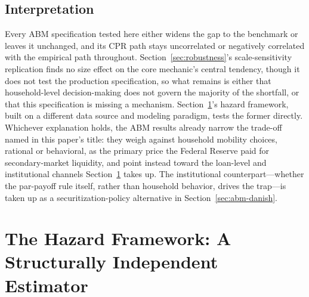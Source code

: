 \documentclass[12pt]{article}
\begin{document}
\subsection{Interpretation}\label{sec:abm-interp}

Every ABM specification tested here either widens the gap to the benchmark or leaves it unchanged, and its CPR path stays uncorrelated or negatively correlated with the empirical path throughout. Section~\ref{sec:robustness}'s scale-sensitivity replication finds no size effect on the core mechanic's central tendency, though it does not test the production specification, so what remains is either that household-level decision-making does not govern the majority of the shortfall, or that this specification is missing a mechanism. Section~\ref{sec:hazard}'s hazard framework, built on a different data source and modeling paradigm, tests the former directly. Whichever explanation holds, the ABM results already narrow the trade-off named in this paper's title: they weigh against household mobility choices, rational or behavioral, as the primary price the Federal Reserve paid for secondary-market liquidity, and point instead toward the loan-level and institutional channels Section~\ref{sec:hazard} takes up. The institutional counterpart---whether the par-payoff rule itself, rather than household behavior, drives the trap---is taken up as a securitization-policy alternative in Section~\ref{sec:abm-danish}.

\section{The Hazard Framework: A Structurally Independent Estimator}\label{sec:hazard}
\end{document}
